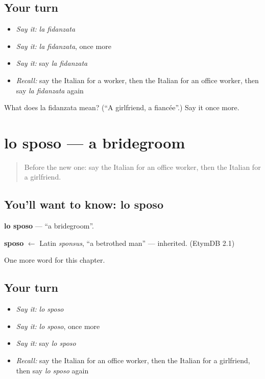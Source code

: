 \subsection*{Your turn}
\begin{itemize}
\raggedright
  \item \emph{Say it:} \emph{la fidanzata}
  \item \emph{Say it:} \emph{la fidanzata}, once more
  \item \emph{Say it:} say \emph{la fidanzata}
  \item \emph{Recall:} say the Italian for a worker, then the Italian for an office worker, then say \emph{la fidanzata} again
\end{itemize}

\begin{tcolorbox}[breakable,colback=teal!4,colframe=teal!35!black,title={Before you move on}]
What does la fidanzata mean? (\textquotedblleft{}A girlfriend, a fiancée\textquotedblright{}.) Say it once more.
\end{tcolorbox}
\section[lo sposo]{lo sposo — a bridegroom}

\label{lesson:IT-C164-sposo}



\begin{quote}
Before the new one: say the Italian for an office worker, then the Italian for a girlfriend.
\end{quote}

\subsection*{You'll want to know: lo sposo}
\textbf{lo sposo} — \textquotedblleft{}a bridegroom\textquotedblright{}.

\begin{cousinweb}
\textbf{sposo} $\leftarrow$ Latin \emph{sponsus}, \textquotedblleft{}a betrothed man\textquotedblright{} — inherited. (EtymDB 2.1)
\end{cousinweb}

\begin{grammarlens}[title={What you've built}]
One more word for this chapter.
\end{grammarlens}

\subsection*{Your turn}
\begin{itemize}
\raggedright
  \item \emph{Say it:} \emph{lo sposo}
  \item \emph{Say it:} \emph{lo sposo}, once more
  \item \emph{Say it:} say \emph{lo sposo}
  \item \emph{Recall:} say the Italian for an office worker, then the Italian for a girlfriend, then say \emph{lo sposo} again
\end{itemize}

